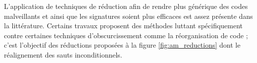 L'application de techniques de réduction afin de rendre plus générique des codes malveillants et ainsi que les signatures soient plus efficaces est assez présente dans la littérature. 
Certains travaux \cite{CKJKVM05} proposent des méthodes luttant spécifiquement contre certaines techniques d'obscurcissement comme la réorganisation de code ; c'est l'objectif des réductions proposées à la figure \ref{fig:am_reductions} dont le réalignement des sauts inconditionnels.